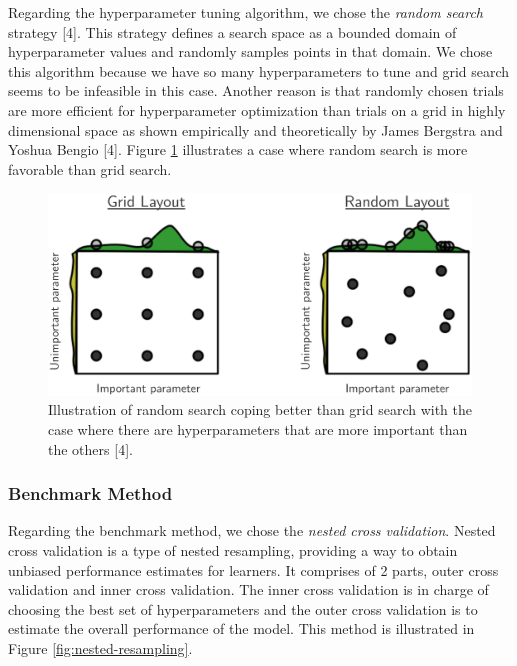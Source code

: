 \documentclass[
]{article}
\begin{document}
Regarding the hyperparameter tuning algorithm, we chose the \emph{random search} strategy {[}4{]}. This strategy defines a search space as a bounded domain of hyperparameter values and randomly samples points in that domain. We chose this algorithm because we have so many hyperparameters to tune and grid search seems to be infeasible in this case. Another reason is that randomly chosen trials are more efficient for hyperparameter optimization than trials on a grid in highly dimensional space as shown empirically and theoretically by James Bergstra and Yoshua Bengio {[}4{]}. Figure \ref{fig:random-search} illustrates a case where random search is more favorable than grid search.



\begin{figure}

{\centering \includegraphics[width=0.7\linewidth]{random-search} 

}

\caption{Illustration of random search coping better than grid search with the case where there are hyperparameters that are more important than the others {[}4{]}.}\label{fig:random-search}
\end{figure}

\hypertarget{benchmark-method}{%
\subsubsection{Benchmark Method}\label{benchmark-method}}

Regarding the benchmark method, we chose the \emph{nested cross validation}. Nested cross validation is a type of nested resampling, providing a way to obtain unbiased performance estimates for learners. It comprises of 2 parts, outer cross validation and inner cross validation. The inner cross validation is in charge of choosing the best set of hyperparameters and the outer cross validation is to estimate the overall performance of the model. This method is illustrated in Figure \ref{fig:nested-resampling}.
\end{document}
